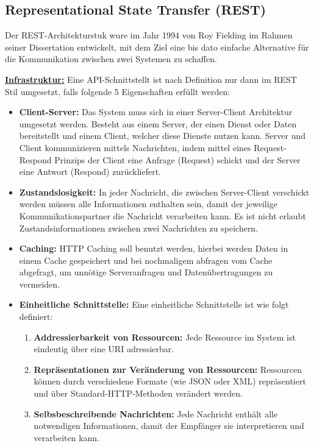 \subsection{Representational State Transfer (REST)}

Der REST-Architekturstuk wure im Jahr 1994 von Roy Fielding im Rahmen seiner Dissertation entwickelt, mit dem Ziel eine bis dato einfache Alternative für die Kommunikation zwischen zwei Systemen zu schaffen. 

\textbf{\underline{Infrastruktur:}}
Eine API-Schnittstellt ist nach Definition nur dann im REST Stil umgesetzt, falls folgende 5 Eigenschaften erfüllt werden:


\begin{itemize}
	\item \textbf{Client-Server:}
	Das System muss sich in einer Server-Client Architektur umgesetzt werden. Besteht aus einem Server, der einen Dienst oder Daten bereitstellt und einem Client, welcher diese Dienste nutzen kann. Server und Client kommunizieren mittels Nachrichten, indem mittel eines Request-Respond Prinzips der Client eine Anfrage (Request) schickt und der Server eine Antwort (Respond)
	zurückliefert.
	
	\item \textbf{Zustandslosigkeit:} 
	In jeder Nachricht, die zwischen Server-Client verschickt werden müssen alle Informationen enthalten sein, damit der jeweilige Kommunikationspartner die Nachricht verarbeiten kann. Es ist nicht erlaubt Zustandsinformationen zwischen zwei Nachrichten zu speichern.
	\item \textbf{Caching:}
	HTTP Caching soll benutzt werden, hierbei werden Daten in einem Cache gespeichert und bei nochmaligem abfragen vom Cache abgefragt, um unnötige Serveranfragen und Datenübertragungen zu vermeiden.
	\item \textbf{Einheitliche Schnittstelle:}
	Eine einheitliche Schnittstelle ist wie folgt definiert:
	
	\begin{enumerate}
		\item \textbf{Addressierbarkeit von Ressourcen:}
		Jede Ressource im System ist eindeutig über eine URI adressierbar.
		\item \textbf{Repräsentationen zur Veränderung von Ressourcen:}
		Ressourcen können durch verschiedene Formate (wie JSON oder XML) repräsentiert und über Standard-HTTP-Methoden verändert werden.
		
		\item \textbf{Selbsbeschreibende Nachrichten:}
		Jede Nachricht enthält alle notwendigen Informationen, damit der Empfänger sie interpretieren und verarbeiten kann.
		

\end{enumerate}
\end{itemize}
